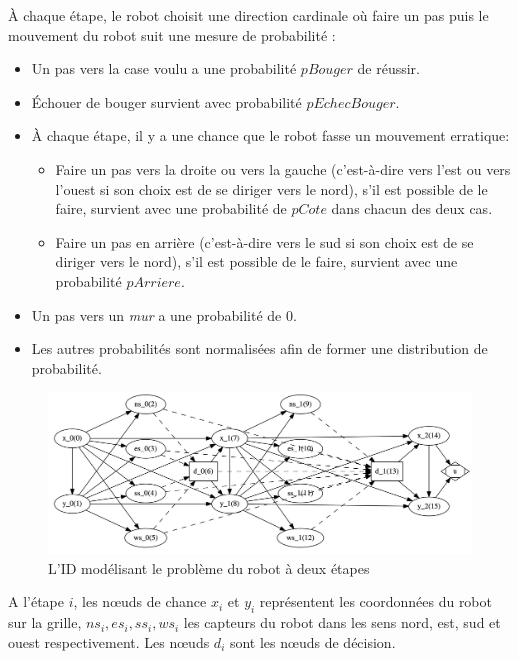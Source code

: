 \documentclass[12pt]{article}
\begin{document}
À chaque étape, le robot choisit une direction cardinale où faire un pas puis le mouvement du robot suit une mesure de probabilité :
\begin{itemize}
  \item Un pas vers la case voulu a une probabilité $pBouger$ de réussir.
  \item Échouer de bouger survient avec probabilité $pEchecBouger$.
  \item À chaque étape, il y a une chance que le robot fasse un mouvement erratique:
  \begin{itemize}
        \item Faire un pas vers la droite ou vers la gauche (c'est-à-dire vers l'est ou vers l'ouest si son choix est de se diriger vers le nord), s'il est possible de le faire, survient avec une probabilité de $pCote$ dans chacun des deux cas.
        \item Faire un pas en arrière (c'est-à-dire vers le sud si son choix est de se diriger vers le nord), s'il est possible de le faire, survient avec une probabilité $pArriere$.
        \end{itemize}
  \item Un pas vers un \textit{mur} a une probabilité de 0.
  \item Les autres probabilités sont normalisées afin de former une distribution de probabilité.
\end{itemize}
\begin{figure}[h]
\centering
\includegraphics[scale=0.22]{docs/IDROBOT.png}
\caption{L'ID modélisant le problème du robot à deux étapes }
\end{figure}
A l'étape $i$, les nœuds de chance $x_i$ et $y_i$ représentent les coordonnées du robot sur la grille, $ns_i, es_i, ss_i, ws_i$ les capteurs du robot dans les sens nord, est, sud et ouest respectivement. Les nœuds $d_i$ sont les nœuds de décision.
\end{document}

